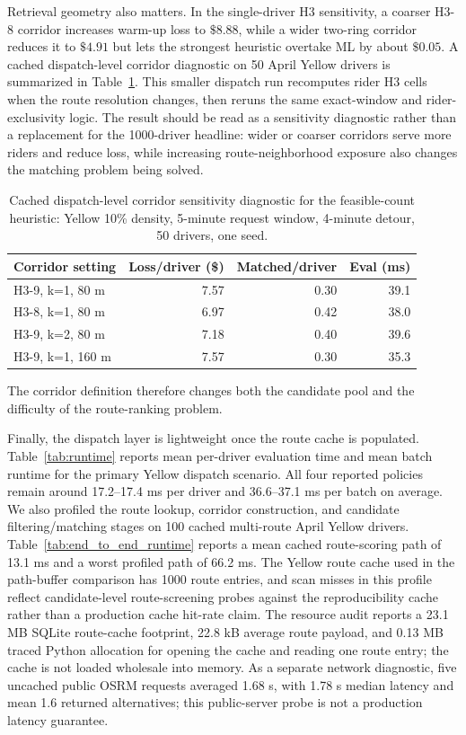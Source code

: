 \documentclass[journal]{IEEEtran}
\begin{document}
Retrieval geometry also matters. In the single-driver H3 sensitivity, a coarser H3-8 corridor increases warm-up loss to \(\$8.88\), while a wider two-ring corridor reduces it to \(\$4.91\) but lets the strongest heuristic overtake ML by about \(\$0.05\). A cached dispatch-level corridor diagnostic on 50 April Yellow drivers is summarized in Table~\ref{tab:dispatch_corridor_sensitivity}. This smaller dispatch run recomputes rider H3 cells when the route resolution changes, then reruns the same exact-window and rider-exclusivity logic. The result should be read as a sensitivity diagnostic rather than a replacement for the 1000-driver headline: wider or coarser corridors serve more riders and reduce loss, while increasing route-neighborhood exposure also changes the matching problem being solved.

\begin{table}[!t]
\caption{Cached dispatch-level corridor sensitivity diagnostic for the feasible-count heuristic: Yellow 10\% density, 5-minute request window, 4-minute detour, 50 drivers, one seed.}
\label{tab:dispatch_corridor_sensitivity}
\centering
\scriptsize
\setlength{\tabcolsep}{3.0pt}
\begin{tabular}{|l|r|r|r|}
\hline
Corridor setting & Loss/driver (\$) & Matched/driver & Eval (ms) \\
\hline
H3-9, k=1, 80 m & 7.57 & 0.30 & 39.1 \\
\hline
H3-8, k=1, 80 m & 6.97 & 0.42 & 38.0 \\
\hline
H3-9, k=2, 80 m & 7.18 & 0.40 & 39.6 \\
\hline
H3-9, k=1, 160 m & 7.57 & 0.30 & 35.3 \\
\hline
\end{tabular}
\end{table}

The corridor definition therefore changes both the candidate pool and the difficulty of the route-ranking problem.

Finally, the dispatch layer is lightweight once the route cache is populated. Table~\ref{tab:runtime} reports mean per-driver evaluation time and mean batch runtime for the primary Yellow dispatch scenario. All four reported policies remain around 17.2--17.4 ms per driver and 36.6--37.1 ms per batch on average. We also profiled the route lookup, corridor construction, and candidate filtering/matching stages on 100 cached multi-route April Yellow drivers. Table~\ref{tab:end_to_end_runtime} reports a mean cached route-scoring path of 13.1 ms and a worst profiled path of 66.2 ms. The Yellow route cache used in the path-buffer comparison has 1000 route entries, and scan misses in this profile reflect candidate-level route-screening probes against the reproducibility cache rather than a production cache hit-rate claim. The resource audit reports a 23.1 MB SQLite route-cache footprint, 22.8 kB average route payload, and 0.13 MB traced Python allocation for opening the cache and reading one route entry; the cache is not loaded wholesale into memory. As a separate network diagnostic, five uncached public OSRM requests averaged 1.68 s, with 1.78 s median latency and mean 1.6 returned alternatives; this public-server probe is not a production latency guarantee.
\end{document}
